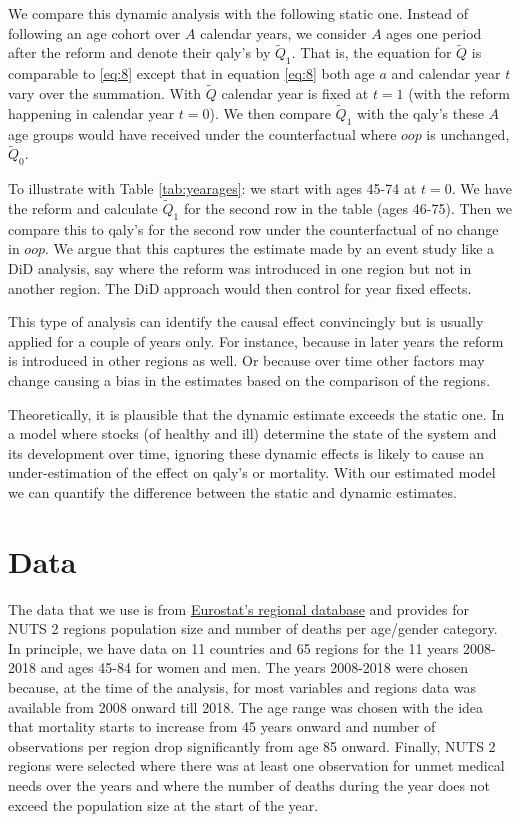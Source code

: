 \documentclass[a4paper,12pt]{article}
\begin{document}
We compare this dynamic analysis with the following static one. Instead of following an age cohort over \(A\) calendar years, we consider \(A\) ages one period after the reform and denote their qaly's by \(\tilde Q_1\). That is, the equation for \(\tilde Q\) is comparable to \eqref{eq:8} except that in equation \eqref{eq:8} both age \(a\) and calendar year \(t\) vary over the summation. With \(\tilde Q\) calendar year is fixed at \(t=1\) (with the reform happening in calendar year \(t=0\)). We then compare \(\tilde Q_1\) with the qaly's these \(A\) age groups would have received under the counterfactual where \(oop\) is unchanged, \(\tilde Q_0\).

To illustrate with Table \ref{tab:yearages}: we start with ages 45-74 at \(t=0\). We have the reform and calculate \(\tilde Q_1\) for the second row in the table (ages 46-75). Then we compare this to qaly's for the second row under the counterfactual of no change in \(oop\). We argue that this captures the estimate made by an event study like a DiD analysis, say where the reform was introduced in one region but not in another region. The DiD approach would then control for year fixed effects.

This type of analysis can identify the causal effect convincingly but is usually applied for a couple of years only. For instance, because in later years the reform is introduced in other regions as well. Or because over time other factors may change causing a bias in the estimates based on the comparison of the regions.

Theoretically, it is plausible that the dynamic estimate exceeds the static one. In a model where stocks (of healthy and ill) determine the state of the system and its development over time, ignoring these dynamic effects is likely to cause an under-estimation of the effect on qaly's or mortality. With our estimated model we can quantify the difference between the static and dynamic estimates.
\section{Data}
\label{sec:org2cfd96e}

The data that we use is from \href{https://ec.europa.eu/eurostat/web/regions/database}{Eurostat's regional database} and provides for NUTS 2 regions population size and number of deaths per age/gender category. In principle, we have data on 11 countries and 65 regions for the 11 years 2008-2018 and ages 45-84 for women and men. The years 2008-2018 were chosen  because, at the time of the analysis, for most variables and regions data was available from 2008 onward till 2018. The age range was chosen with the idea that mortality starts to increase from 45 years onward and number of observations per region drop significantly from age 85 onward. Finally, NUTS 2 regions were selected where there was at least one observation for unmet medical needs over the years and where the number of deaths during the year does not exceed the population size at the start of the year.
\end{document}

